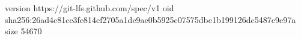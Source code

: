 version https://git-lfs.github.com/spec/v1
oid sha256:26ad4c81ce3fe814cf2705a1de9ae0b5925c07575dbe1b199126dc5487c9e97a
size 54670
